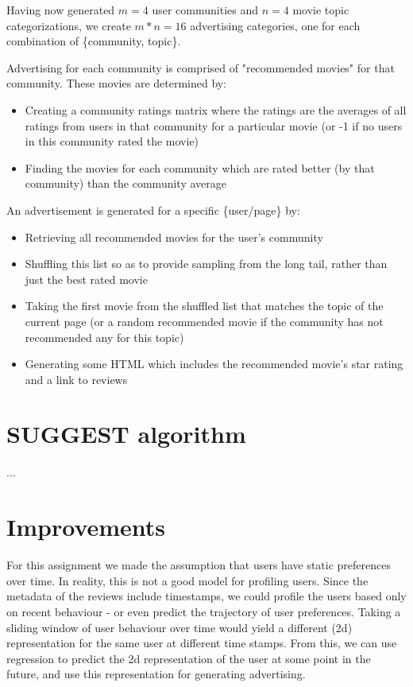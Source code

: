 \documentclass[11pt]{article}
\begin{document}
Having now generated $m = 4$ user communities and $n = 4$ movie topic categorizations, we create $m * n = 16$ advertising categories, one for each combination of \{community, topic\}.\newline

Advertising for each community is comprised of "recommended movies" for that community. These movies are determined by:

\begin{itemize}
    \item Creating a community ratings matrix where the ratings are the averages of all ratings from users in that community for a particular movie (or -1 if no users in this community rated the movie)
    \item Finding the movies for each community which are rated better (by that community) than the community average
\end{itemize}

An advertisement is generated for a specific \{user/page\} by:

\begin{itemize}
    \item Retrieving all recommended movies for the user's community
    \item Shuffling this list so as to provide sampling from the long tail, rather than just the best rated movie
    \item Taking the first movie from the shuffled list that matches the topic of the current page (or a random recommended movie if the community has not recommended any for this topic)
    \item Generating some HTML which includes the recommended movie's star rating and a link to reviews
\end{itemize}


\section{SUGGEST algorithm}

...


\section{Improvements}

For this assignment we made the assumption that users have static preferences over time. In reality, this is not a good model for profiling users. Since the metadata of the reviews include timestamps, we could profile the users based only on recent behaviour - or even predict the trajectory of user preferences. Taking a sliding window of user behaviour over time would yield a different (2d) representation for the same user at different time stamps. From this, we can use regression to predict the 2d representation of the user at some point in the future, and use this representation for generating advertising.\newline
\end{document}
